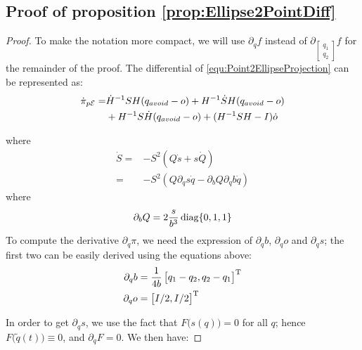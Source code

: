 \documentclass[journal]{IEEEtran}  %
\begin{document}
  \subsection{Proof of proposition \ref{prop:Ellipse2PointDiff}}
  \begin{proof}
    To make the notation more compact, we will use $\partial_q f$ instead of $\partial_{\left[\begin{smallmatrix}q_1\\q_2\end{smallmatrix}\right]} f$ for the remainder of the proof.
    The differential of \eqref{equ:Point2EllipseProjection} can be represented as:
    \begin{equation}\label{equ:dPi_dt}
      \begin{split}
        \dot \pi_{p\mathcal{E}} = &  \dot H^{-1}SH (q_{avoid} - o)  + H^{-1}\dot S H (q_{avoid} - o) \\
        &+ H^{-1}S \dot H (q_{avoid} - o) + (H^{-1}SH -I)\dot o\\
      \end{split}
    \end{equation}

    where
    \begin{equation}\label{equ:S_dot}
      \begin{split}
        \dot S  =& - S^2 (Q \dot s + s \dot Q)\\
        =& - S^2 (Q \partial_q s \dot q - \partial_b Q \partial_q b \dot q)
      \end{split}
    \end{equation}
    where
    \begin{equation}
      \partial_b Q = 2\frac{s}{b^3} \operatorname{diag}\{0,1,1\}
    \end{equation}
    To compute the derivative $\partial_q \pi$, we need the expression of $\partial_q b$, $\partial_q o$ and $\partial_q s$; the first two can be easily derived using the equations above:
    \begin{align}
      \partial_q b &= \frac{1}{4b}\begin{bmatrix}q_1-q_2,q_2-q_1\end{bmatrix}^\mathrm{T}\\
      \partial_q o &= \begin{bmatrix}I/2,I/2\end{bmatrix}^\mathrm{T}
    \end{align}

    In order to get $\partial_q s$, we use the fact that $F\bigl(s(q)\bigr)=0$ for all $q$; hence $F\bigl(\tilde{q}(t)\bigr)\equiv 0$, and $\partial_q F = 0$. We then have:


\end{proof}
\end{document}

